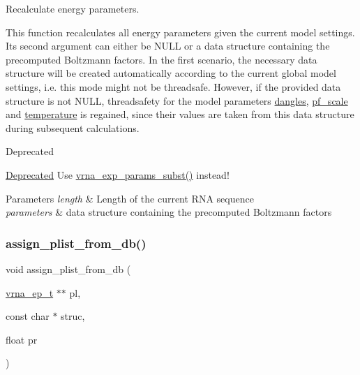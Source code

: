 Recalculate energy parameters. 

This function recalculates all energy parameters given the current model settings. It\textquotesingle{}s second argument can either be N\+U\+LL or a data structure containing the precomputed Boltzmann factors. In the first scenario, the necessary data structure will be created automatically according to the current global model settings, i.\+e. this mode might not be threadsafe. However, if the provided data structure is not N\+U\+LL, threadsafety for the model parameters \hyperlink{group__model__details_ga72b511ed1201f7e23ec437e468790d74}{dangles}, \hyperlink{group__model__details_gad3b22044065acc6dee0af68931b52cfd}{pf\+\_\+scale} and \hyperlink{group__model__details_gab4b11c8d9c758430960896bc3fe82ead}{temperature} is regained, since their values are taken from this data structure during subsequent calculations.

\begin{DoxyRefDesc}{Deprecated}
\item[\hyperlink{deprecated__deprecated000118}{Deprecated}]Use \hyperlink{group__energy__parameters_ga8e7ac4fab3b0cc03afbc134eaafb3525}{vrna\+\_\+exp\+\_\+params\+\_\+subst()} instead!\end{DoxyRefDesc}



\begin{DoxyParams}{Parameters}
{\em length} & Length of the current R\+NA sequence \\
\hline
{\em parameters} & data structure containing the precomputed Boltzmann factors \\
\hline
\end{DoxyParams}
\mbox{\label{group__part__func__global__deprecated_gab61df77cf7949cd516181fce0c3d7d78}} 
\subsubsection{\texorpdfstring{assign\+\_\+plist\+\_\+from\+\_\+db()}{assign\_plist\_from\_db()}}
{\footnotesize\ttfamily void assign\+\_\+plist\+\_\+from\+\_\+db (\begin{DoxyParamCaption}\item[{\hyperlink{group__struct__utils__plist_gab9ac98ab55ded9fb90043b024b915aca}{vrna\+\_\+ep\+\_\+t} $\ast$$\ast$}]{pl,  }\item[{const char $\ast$}]{struc,  }\item[{float}]{pr }\end{DoxyParamCaption})}



